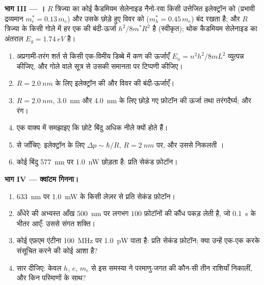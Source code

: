 \begin{problem}
\medskip
\noindent\textbf{भाग III --- ।}
$R$ त्रिज्या का कोई कैडमियम सेलेनाइड नैनो-रवा किसी उत्तेजित इलेक्ट्रॉन को
(प्रभावी द्रव्यमान $m_e^\ast = 0.13\,m_e$) और उसके छोड़े हुए विवर को
($m_h^\ast = 0.45\,m_e$) बंद रखता है; और $R$ त्रिज्या के किसी गोले में हर
एक की बंदी-ऊर्जा $h^2/8m^\ast R^2$ है (स्वीकृत); थोक कैडमियम सेलेनाइड का अंतराल
$E_g = \qty{1.74}{eV}$ है।
\begin{enumerate}[resume]
  \item अप्रगामी-तरंग शर्त से किसी एक-विमीय डिब्बे में कण की ऊर्जाएँ
        $E_n = n^2h^2/8mL^2$ व्युत्पन्न कीजिए, और गोले वाले सूत्र से
        उसकी समानता पर टिप्पणी कीजिए।
  \item $R = \qty{2.0}{nm}$ के लिए इलेक्ट्रॉन की और विवर की बंदी-ऊर्जाएँ।
  \item $R = \qty{2.0}{nm}$, \qty{3.0}{nm} और \qty{4.0}{nm} के लिए छोड़े गए
        फ़ोटॉन की ऊर्जा तथा तरंगदैर्घ्य; और रंग।
  \item एक वाक्य में समझाइए कि छोटे बिंदु अधिक नीले क्यों होते हैं।
  \item {} से  जाँचिए:
        इलेक्ट्रॉन के लिए $\Delta p \sim \hbar/R$, $R = \qty{2}{nm}$ पर, और
        उससे निकलती ।
  \item कोई बिंदु \qty{577}{nm} पर \qty{1.0}{nW} छोड़ता है: प्रति सेकंड
        फ़ोटॉन।
\end{enumerate}

\medskip
\noindent\textbf{भाग IV --- क्वांटम गिनना।}
\begin{enumerate}[resume]
  \item \qty{633}{nm} पर \qty{1.0}{mW} के किसी लेज़र से प्रति सेकंड फ़ोटॉन।
  \item अँधेरे की अभ्यस्त आँख \qty{500}{nm} पर लगभग $100$ फ़ोटॉनों की कौंध
        पकड़ लेती है, जो \qty{0.1}{s} के भीतर आएँ: उससे संगत शक्ति।
  \item कोई एफ़एम एंटीना \qty{100}{MHz} पर \qty{1.0}{pW} पाता है: प्रति
        सेकंड फ़ोटॉन; क्या उन्हें एक-एक करके संसूचित करने की कोई आशा है?
  \item सार दीजिए: केवल $h$, $e$, $m_e$ से इस समस्या ने परमाणु-जगत की
        कौन-सी तीन राशियाँ निकालीं, और किन परिमाणों के साथ?
\end{enumerate}
\end{problem}
